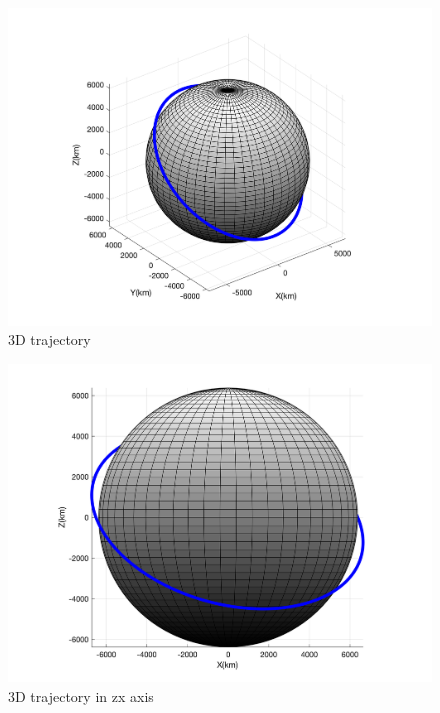     \begin{figure}[H]
        \caption{3D trajectory}
        \centering
        \includegraphics[width=16cm]{../Figure/Short_project/3Dof_view.png}
    \end{figure}

    \begin{figure}[H]
        \caption{3D trajectory in zx axis}
        \centering
        \includegraphics[width=16cm]{../Figure/Short_project/xz_view.png}
    \end{figure}

